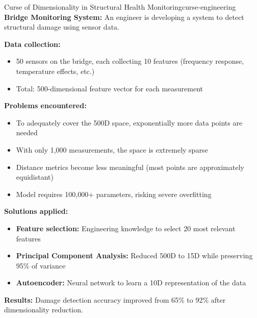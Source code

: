 \documentclass[12pt]{article}
\begin{document}
\begin{example}{Curse of Dimensionality in Structural Health Monitoring}{curse-engineering}
\textbf{Bridge Monitoring System:} An engineer is developing a system to detect structural damage using sensor data.

\textbf{Data collection:}
\begin{itemize}
    \item 50 sensors on the bridge, each collecting 10 features (frequency response, temperature effects, etc.)
    \item Total: 500-dimensional feature vector for each measurement
\end{itemize}

\textbf{Problems encountered:}
\begin{itemize}
    \item To adequately cover the 500D space, exponentially more data points are needed
    \item With only 1,000 measurements, the space is extremely sparse
    \item Distance metrics become less meaningful (most points are approximately equidistant)
    \item Model requires 100,000+ parameters, risking severe overfitting
\end{itemize}

\textbf{Solutions applied:}
\begin{itemize}
    \item \textbf{Feature selection:} Engineering knowledge to select 20 most relevant features
    \item \textbf{Principal Component Analysis:} Reduced 500D to 15D while preserving 95\% of variance
    \item \textbf{Autoencoder:} Neural network to learn a 10D representation of the data
\end{itemize}

\textbf{Results:} Damage detection accuracy improved from 65\% to 92\% after dimensionality reduction.

\begin{center}
\end{center}
\end{example}
\end{document}
